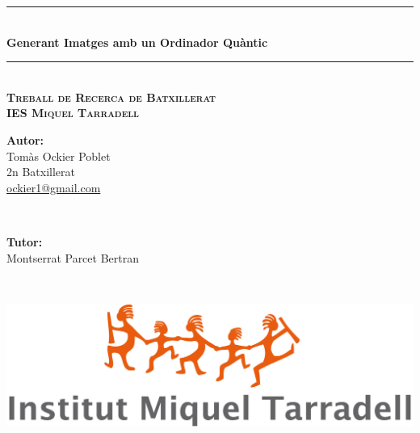 \documentclass[a4paper,12pt,arial,numbered,print,index,oneside]{book}
\newcommand{\HRule}{\rule{\linewidth}{0.5mm}} %
\begin{document}
	\begin{titlepage}
		
		\begin{center}
		\begin{singlespace}%

		
		\HRule \\[0.4cm]
		{ \Huge \bfseries Generant Imatges amb un Ordinador Quàntic}\\[0.1cm] 
		\HRule \\[1.2cm]
		
		\textsc{\Large \textbf{Treball de Recerca de Batxillerat}}\\[.5cm]
		
		\textsc{\large \textbf{IES Miquel Tarradell}}\\[2cm]
		
		\vspace{8.5cm}
		\begin{minipage}{0.48\textwidth}
			\begin{flushleft} \large
				\Large \textbf{Autor:}\\
				\Large Tomàs Ockier Poblet \\ 2n Batxillerat \\ \href{mailto:ockier1@gmail.com}{ockier1@gmail.com}
			\end{flushleft}
		\end{minipage}
		~
		\begin{minipage}{0.48\textwidth}
			\begin{flushright} \large
				\Large \textbf{Tutor:} \\
				\Large Montserrat Parcet Bertran 
			\end{flushright}
		\end{minipage}\\
		
		\vspace{1.5cm}
		\begin{minipage}{0.85\textwidth}
			\begin{center}
								\includegraphics[scale=0.2]{Figures/Cover/logo-tarradell.jpg}
			\end{center}
		\end{minipage}
		

\end{singlespace}
\end{center}
\end{titlepage}
\end{document}
